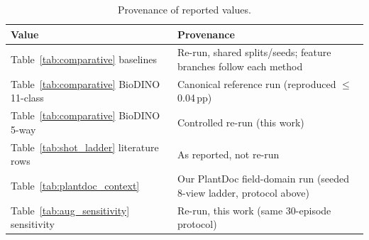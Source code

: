 \begin{table}[htbp]
\caption{Provenance of reported values.}
\label{tab:provenance}
\centering

\footnotesize
\begin{tabularx}{\columnwidth}{l X}
\toprule
\textbf{Value} & \textbf{Provenance} \\
\midrule
Table~\ref{tab:comparative} baselines & Re-run, shared splits/seeds; feature branches follow each method \\
Table~\ref{tab:comparative} BioDINO 11-class & Canonical reference run (reproduced $\le$0.04\,pp) \\
Table~\ref{tab:comparative} BioDINO 5-way & Controlled re-run (this work) \\
Table~\ref{tab:shot_ladder} literature rows & As reported, not re-run \\
Table~\ref{tab:plantdoc_context} & Our PlantDoc field-domain run (seeded 8-view ladder, protocol above) \\
Table~\ref{tab:aug_sensitivity} sensitivity & Re-run, this work (same 30-episode protocol) \\
\bottomrule
\end{tabularx}
\end{table}

